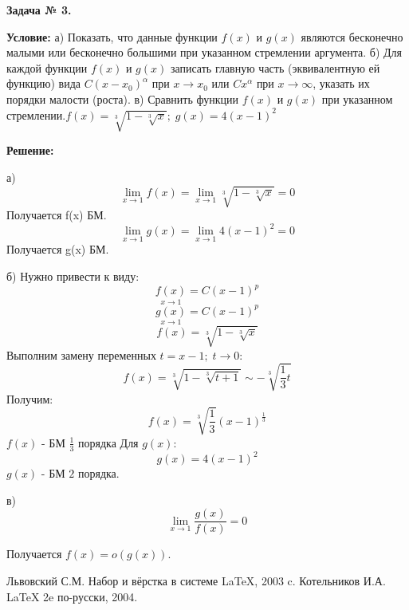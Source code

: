 \documentclass[12pt]{article}
\begin{document}
\newpage
\begin{center}
\textbf{Задача № 3.}   
\end{center}
\textbf{Условие:}
а) Показать, что данные функции $f(x)$ и $g(x)$ являются бесконечно малыми или бесконечно большими
при указанном стремлении аргумента. б) Для каждой функции $f(x)$ и $g(x)$ записать главную часть
(эквивалентную ей функцию)  вида $C(x-x_0)^{\alpha}$ при $x\rightarrow x_0$ или $Cx^{\alpha}$
при $x\rightarrow\infty$, указать их порядки малости (роста). в) Сравнить функции $f(x)$ и $g(x)$ при указанном стремлении.$f(x) = \sqrt[3]{1-{\sqrt[3]{x}}};\; g(x) = 4(x-1)^{2}$

\textbf{Решение:}

а)
$$\lim\limits_{x\rightarrow 1} f(x) = \lim\limits_{x\rightarrow 1}\sqrt[3]{1-{\sqrt[3]{x}}}=0 $$ 
Получается f(x) БМ.
$$\lim\limits_{x\rightarrow 1} g(x) = \lim\limits_{x\rightarrow 1} 4(x-1)^{2} = 0 $$
Получается g(x) БМ.

б)
Нужно привести к виду:
$$\underset{x \rightarrow 1}{f(x)} = C(x-1)^{p}$$
$$\underset{x \rightarrow 1}{g(x)} = C(x-1)^{p}$$
$$f(x) = \sqrt[3]{1-{\sqrt[3]{x}}}$$
Выполним замену переменных $t = x-1; \; t \rightarrow 0:$
$$f(x)=\sqrt[3]{1-{\sqrt[3]{t+1}}} \sim -\sqrt[3]{\frac{1}{3} t}$$
Получим:
$$f(x)= \sqrt[3]{\frac{1}{3}} (x-1)^{\frac{1}{3}}$$
$f(x)$ - БМ $\frac{1}{3}$ порядка
Для $g(x)$:
$$g(x) = 4(x-1)^{2}$$
$g(x)$ - БМ $2$ порядка.

в)
$$\lim\limits_{x\rightarrow 1} \frac{g(x)}{f(x)} = 0$$ 

Получается $f(x) = o(g(x))$.

\newpage
{}
\begin{thebibliography}{99}
 Львовский С.М. Набор и вёрстка в системе \LaTeX, 2003 c.
 Котельников И.А. \LaTeX \; 2e по-русски, 2004.
\end{thebibliography}
\end{document}
